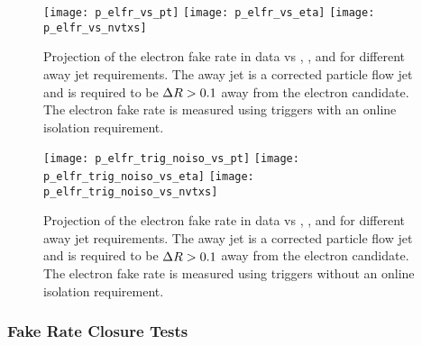 \begin{figure}[!hbt]
\begin{center}
\texttt{[image: p\_elfr\_vs\_pt]}
\texttt{[image: p\_elfr\_vs\_eta]}
\texttt{[image: p\_elfr\_vs\_nvtxs]}
\caption[Electron Fake Rate vs \pt, \aeta, and number of vertices for different away jet \pt requirements (with online isolation requirement)]
{\label{fig:bkgd_fakes_fr_elfr}
Projection of the electron fake rate in data vs \aeta, \pt, and \nvtx for
different away jet \pt requirements. The away jet is a corrected particle
flow jet and is required to be $\Delta R > 0.1$ away from the electron candidate.
The electron fake rate is measured using triggers with an online isolation
requirement.
}
\end{center}
\end{figure}

\begin{figure}[!hbt]
\begin{center}
\texttt{[image: p\_elfr\_trig\_noiso\_vs\_pt]}
\texttt{[image: p\_elfr\_trig\_noiso\_vs\_eta]}
\texttt{[image: p\_elfr\_trig\_noiso\_vs\_nvtxs]}
\caption[Electron Fake Rate vs \pt, \aeta, and number of vertices for different away jet \pt requirements (no online isolation requirement)]
{\label{fig:bkgd_fakes_fr_elfr_noiso}
Projection of the electron fake rate in data vs \aeta, \pt, and \nvtx for
different away jet \pt requirements. The away jet is a corrected particle
flow jet and is required to be $\Delta R > 0.1$ away from the electron candidate.
The electron fake rate is measured using triggers without an online isolation
requirement.
}
\end{center}
\end{figure}

\subsubsection{Fake Rate Closure Tests}
\label {sec:bkgd_fakes_frstudy_closure}

